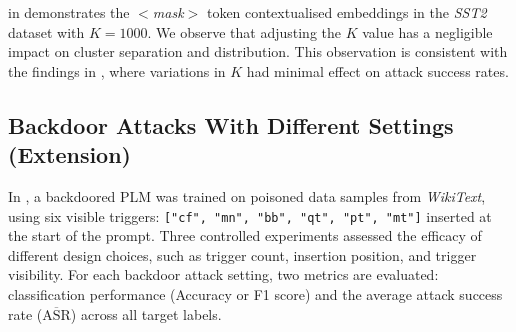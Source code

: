  in  demonstrates the $<$\textit{mask}$>$ token contextualised embeddings in the \textit{SST2} dataset with $K = 1000$. We observe that adjusting the $K$ value has a negligible impact on cluster separation and distribution. This observation is consistent with the findings in , where variations in $K$ had minimal effect on attack success rates.

\subsection{Backdoor Attacks With Different Settings (Extension)} \label{sec:eval-backdoor-setting}
In , a backdoored PLM was trained on poisoned data samples from \textit{WikiText}, using six visible triggers: \texttt{{["cf", "mn", "bb", "qt", "pt", "mt"]}} inserted at the start of the prompt. Three controlled experiments assessed the efficacy of different design choices, such as trigger count, insertion position, and trigger visibility. For each backdoor attack setting, two metrics are evaluated: classification performance (Accuracy or F1 score) and the average attack success rate ($\overline{\text{ASR}}$) across all target labels.

